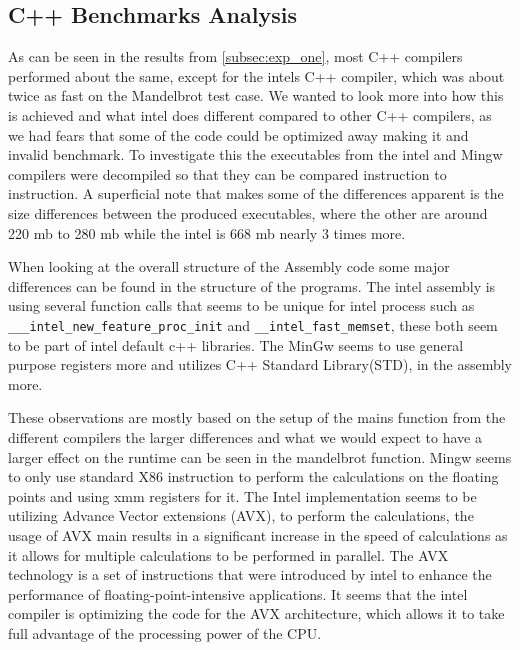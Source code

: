 \subsection{C++ Benchmarks Analysis}
As can be seen in the results from \cref{subsec:exp_one}, most C++ compilers performed about the same, except for the intels C++ compiler, which was about twice as fast on the Mandelbrot test case. We wanted to look more into how this is achieved and what intel does different compared to other C++ compilers, as we had fears that some of the code could be optimized away making it and invalid benchmark. To investigate this the executables from the intel and Mingw compilers were decompiled so that they can be compared instruction to instruction. A superficial note that makes some of the differences apparent is the size differences between the produced executables, where the other are around 220 mb to 280 mb while the intel is 668 mb nearly 3 times more.

When looking at the overall structure of the Assembly code some major differences can be found in the structure of the programs. The intel assembly is using several function calls that seems to be unique for intel process such as \texttt{\_\_\_intel\_new\_feature\_proc\_init} and \texttt{\_\_intel\_fast\_memset}, these both seem to be part of intel default c++ libraries\cite{Intelassembly}. The MinGw seems to use general purpose registers more and utilizes C++ Standard Library(STD), in the assembly more.




These observations are mostly based on the setup of the mains function from the different compilers the larger differences and what we would expect to have a larger effect on the runtime can be seen in the mandelbrot function. Mingw seems to only use standard X86 instruction\cite{X86} to perform the calculations on the floating points and using xmm registers for it. The Intel implementation seems to be utilizing Advance Vector extensions (AVX)\cite{AVX}, to perform the calculations, the usage of AVX main results in a significant increase in the speed of calculations as it allows for multiple calculations to be performed in parallel. The AVX technology is a set of instructions that were introduced by intel to enhance the performance of floating-point-intensive applications\cite{AVX}. It seems that the intel compiler is optimizing the code for the AVX architecture, which allows it to take full advantage of the processing power of the CPU. 

